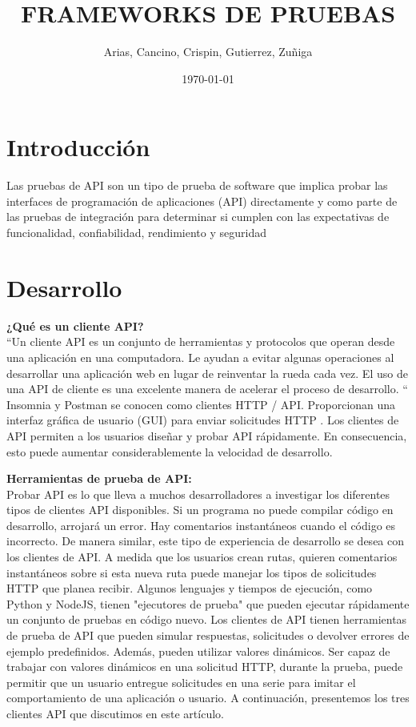 \documentclass[twoside,twocolumn]{article}
\title{FRAMEWORKS DE PRUEBAS} %
\author{Arias, Cancino, Crispin, Gutierrez, Zuñiga}
\date{\today} %
\begin{document}
\maketitle
\vspace*{5 in}
\section{Introducción}
Las pruebas de API son un tipo de prueba de software que implica probar las interfaces de programación de aplicaciones (API) directamente y como parte de las pruebas de integración para determinar si cumplen con las expectativas de funcionalidad, confiabilidad, rendimiento y seguridad
\\
\section{Desarrollo}
\textbf{¿Qué es un cliente API?}\\
“Un cliente API es un conjunto de herramientas y protocolos que operan desde una aplicación en una computadora. Le ayudan a evitar algunas operaciones al desarrollar una aplicación web en lugar de reinventar la rueda cada vez. El uso de una API de cliente es una excelente manera de acelerar el proceso de desarrollo. “
Insomnia y Postman se conocen como clientes HTTP / API. Proporcionan una interfaz gráfica de usuario (GUI) para enviar  solicitudes HTTP .
Los clientes de API permiten a los usuarios diseñar y probar API rápidamente. En consecuencia, esto puede aumentar considerablemente la velocidad de desarrollo.


\textbf{Herramientas de prueba de API:}\\
Probar API es lo que lleva a muchos desarrolladores a investigar los diferentes tipos de clientes API disponibles. Si un programa no puede compilar código en desarrollo, arrojará un error. Hay comentarios instantáneos cuando el código es incorrecto. De manera similar, este tipo de experiencia de desarrollo se desea con los clientes de API. A medida que los usuarios crean rutas, quieren comentarios instantáneos sobre si esta nueva ruta puede manejar los tipos de solicitudes HTTP que planea recibir.
Algunos lenguajes y tiempos de ejecución, como Python y NodeJS, tienen "ejecutores de prueba" que pueden ejecutar rápidamente un conjunto de pruebas en código nuevo. Los clientes de API tienen  herramientas de prueba de API  que pueden simular respuestas, solicitudes o devolver errores de ejemplo predefinidos. Además, pueden utilizar valores dinámicos.
Ser capaz de trabajar con valores dinámicos en una solicitud HTTP, durante la prueba, puede permitir que un usuario entregue solicitudes en una serie para imitar el comportamiento de una aplicación o usuario. A continuación, presentemos los tres clientes API que discutimos en este artículo.
\\
\end{document}
